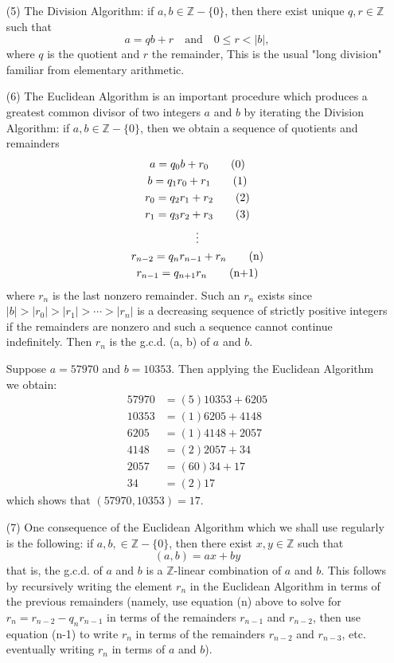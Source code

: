 \documentclass[cn,11pt,chinese]{elegantbook}
\numberwithin{equation}{section}
\begin{document}
\begin{enumerate}
\item[(5)] The Division Algorithm: if $a, b \in \mathbb{Z} -\{0\}$, then there exist unique $q, r\in \mathbb{Z}$ such that
\[
a = qb + r \quad \text{and} \quad 0 \le r < |b|,
\]
where $q$ is the quotient and $r$ the remainder, This is the usual "long division" familiar from elementary arithmetic.

\item[(6)] The Euclidean Algorithm is an important procedure which produces a greatest common divisor of two integers $a$ and $b$ by iterating the Division Algorithm: if $a, b \in \mathbb{Z} - \{0\}$, then we obtain a sequence of quotients and remainders
\begin{gather}
a = q_0b + r_0 \tag{0}\\
b = q_1r_0 + r_1 \tag{1}\\
r_0 = q_2r_1 + r_2 \tag{2}\\
r_1 = q_3r_2 + r_3 \tag{3}\\
\vdots \notag\\
r_{n-2} = q_nr_{n-1} + r_n \tag{n}\\
r_{n-1} = q_{n+1}r_n \tag{n+1}
\end{gather}
where $r_n$ is the last nonzero remainder. Such an $r_n$ exists since $|b| > |r_0| > |r_1| > \cdots > |r_n|$ is a decreasing sequence of strictly positive integers if the remainders are nonzero and such a sequence cannot continue indefinitely. Then $r_n$ is the g.c.d. (a, b) of $a$ and $b$.

\begin{example}
Suppose $a = 57970$ and $b=10353$. Then applying the Euclidean Algorithm we obtain:
\[
\begin{aligned}
57970 &= (5)10353 + 6205\\
10353 &= (1)6205 + 4148\\
6205 &= (1)4148 + 2057\\
4148 &= (2)2057 + 34\\
2057 &= (60)34 + 17\\
34 &= (2)17
\end{aligned}
\]
which shows that $(57970, 10353) = 17$.
\end{example}

\item[(7)] One consequence of the Euclidean Algorithm which we shall use regularly is the following: if $a, b, \in \mathbb{Z} - \{0\}$, then there exist $x, y \in \mathbb{Z}$ such that
\[
(a, b) = ax + by
\]
that is, the g.c.d. of $a$ and $b$ is a $\mathbb{Z}$-linear combination of $a$ and $b$. This follows by recursively writing the element $r_n$ in the Euclidean Algorithm in terms of the previous remainders (namely, use equation (n) above to solve for $r_n = r_{n-2} - q_nr_{n-1}$ in terms of the remainders $r_{n-1}$ and $r_{n-2}$, then use equation (n-1) to write $r_n$ in terms of the remainders $r_{n-2}$ and $r_{n-3}$, etc. eventually writing $r_n$ in terms of $a$ and $b$).


\end{enumerate}
\end{document}
